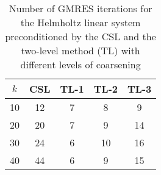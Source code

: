 \begin{table}[t]
\centering
\begin{tabular}{ccccc}
\hline
$k$ & CSL & TL-1 & TL-2 & TL-3 \\ \hline
10 & 12 & 7 & 8 & 9 \\
20 & 20 & 7 & 9 & 14 \\
30 & 24 & 6 & 10 & 16 \\
40 & 44 & 6 & 9 & 15 \\
\hline
\end{tabular}
\caption{Number of GMRES iterations for the Helmholtz linear system preconditioned by the  CSL and the two-level method (TL) with different levels of coarsening}
\label{table:gmres_csl_vs_adef_coarse_eps_5}
\end{table}
